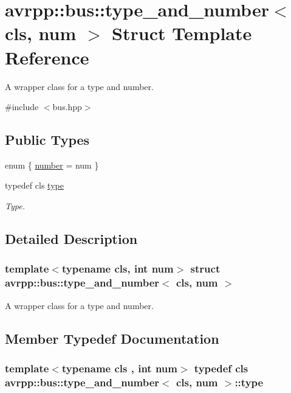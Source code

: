 \hypertarget{structavrpp_1_1bus_1_1type__and__number}{
\section{avrpp::bus::type\_\-and\_\-number$<$ cls, num $>$ Struct Template Reference}
\label{structavrpp_1_1bus_1_1type__and__number}
}


A wrapper class for a type and number.  




{\ttfamily \#include $<$bus.hpp$>$}

\subsection*{Public Types}
\begin{DoxyCompactItemize}
\item 
enum \{ \hyperlink{structavrpp_1_1bus_1_1type__and__number_a3ae933d366a29b8d5265d94d3c3cc852a13d5409b30e6924949f78a6c3a66b708}{number} = num
 \}
\item 
typedef cls \hyperlink{structavrpp_1_1bus_1_1type__and__number_a19099762c4857346dd3b975c816d3002}{type}
\begin{DoxyCompactList}\small\item\em Type. \item\end{DoxyCompactList}\end{DoxyCompactItemize}


\subsection{Detailed Description}
\subsubsection*{template$<$typename cls, int num$>$ struct avrpp::bus::type\_\-and\_\-number$<$ cls, num $>$}

A wrapper class for a type and number. 

\subsection{Member Typedef Documentation}
\hypertarget{structavrpp_1_1bus_1_1type__and__number_a19099762c4857346dd3b975c816d3002}{
\subsubsection[{type}]{\setlength{\rightskip}{0pt plus 5cm}template$<$typename cls , int num$>$ typedef cls {\bf avrpp::bus::type\_\-and\_\-number}$<$ cls, num $>$::{\bf type}}}
\label{structavrpp_1_1bus_1_1type__and__number_a19099762c4857346dd3b975c816d3002}


